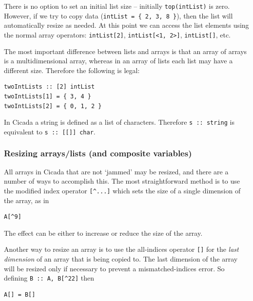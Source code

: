 \documentclass{article}
\newenvironment{code}{
       \begin{list}{}{
               \setlength{\leftmargin}{.4in}
               \setlength{\rightmargin}{0in}
               \setlength{\topsep}{.2in}
       }
       \small
       \item[] }
       { \end{list}   }
\begin{document}
\noindent There is no option to set an initial list size -- initially \verb#top(intList)# is zero.  However, if we try to copy data (\verb#intList = { 2, 3, 8 }#), then the list will automatically resize as needed.  At this point we can access the list elements using the normal array operators:  \verb#intList[2]#, \verb#intList[<1, 2>]#, \verb#intList[]#, etc.

The most important difference between lists and arrays is that an array of arrays is a multidimensional array, whereas in an array of lists each list may have a different size.  Therefore the following is legal:

\begin{code} \begin{verbatim}
twoIntLists :: [2] intList
twoIntLists[1] = { 3, 4 }
twoIntLists[2] = { 0, 1, 2 }
\end{verbatim} \end{code}

In Cicada a string is defined as a list of characters.  Therefore \verb#s :: string# is equivalent to \verb#s :: [[]] char#.


\subsubsection{Resizing arrays/lists (and composite variables)} 

All arrays in Cicada that are not `jammed' may be resized, and there are a number of ways to accomplish this.  The most straightforward method is to use the modified index operator \verb#[^...]# which sets the size of a single dimension of the array, as in

\begin{code} \begin{verbatim}
A[^9]
\end{verbatim} \end{code}

\noindent The effect can be either to increase or reduce the size of the array.

Another way to resize an array is to use the all-indices operator \verb#[]# for the \emph{last dimension} of an array that is being copied to.  The last dimension of the array will be resized only if necessary to prevent a mismatched-indices error.  So defining \verb#B :: A, B[^22]# then

\begin{code} \begin{verbatim}
A[] = B[]
\end{verbatim} \end{code}
\end{document}
